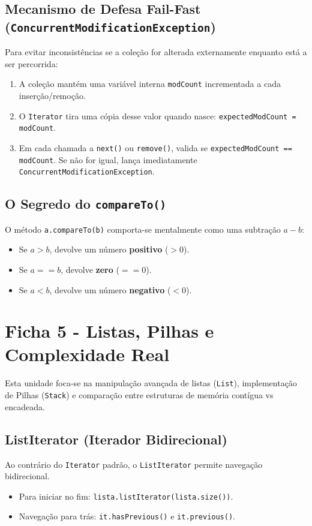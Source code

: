 \documentclass[12pt,a4paper]{article}
\begin{document}
\begin{enumerate}
\subsection*{Mecanismo de Defesa Fail-Fast (\texttt{ConcurrentModificationException})}
Para evitar inconsistências se a coleção for alterada externamente enquanto está a ser percorrida:
\begin{enumerate}
    \item A coleção mantém uma variável interna \texttt{modCount} incrementada a cada inserção/remoção.
    \item O \texttt{Iterator} tira uma cópia desse valor quando nasce: \texttt{expectedModCount = modCount}.
    \item Em cada chamada a \texttt{next()} ou \texttt{remove()}, valida se \texttt{expectedModCount == modCount}. Se não for igual, lança imediatamente \texttt{ConcurrentModificationException}.
\end{enumerate}

\subsection*{O Segredo do \texttt{compareTo()}}
O método \texttt{a.compareTo(b)} comporta-se mentalmente como uma subtração $a - b$:
\begin{itemize}
    \item Se $a > b$, devolve um número \textbf{positivo} ($> 0$).
    \item Se $a == b$, devolve \textbf{zero} ($== 0$).
    \item Se $a < b$, devolve um número \textbf{negativo} ($< 0$).
\end{itemize}


\section{Ficha 5 - Listas, Pilhas e Complexidade Real}
Esta unidade foca-se na manipulação avançada de listas (\texttt{List}), implementação de Pilhas (\texttt{Stack}) e comparação entre estruturas de memória contígua vs encadeada.

\subsection*{ListIterator (Iterador Bidirecional)}
Ao contrário do \texttt{Iterator} padrão, o \texttt{ListIterator} permite navegação bidirecional.
\begin{itemize}
    \item Para iniciar no fim: \texttt{lista.listIterator(lista.size())}.
    \item Navegação para trás: \texttt{it.hasPrevious()} e \texttt{it.previous()}.
\end{itemize}


\end{enumerate}
\end{document}
